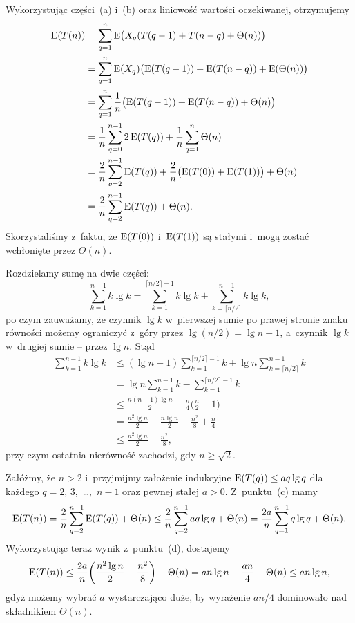 \subproblem %

\noindent Wykorzystując części~(a) i~(b) oraz liniowość wartości oczekiwanej, otrzymujemy
\begin{align*}
	\operatorname{E}(T(n)) &= \sum_{q=1}^n\operatorname{E}\bigl(X_q(T(q-1)+T(n-q)+\Theta(n))\bigr) \\
	&= \sum_{q=1}^n\operatorname{E}(X_q)\bigl(\operatorname{E}(T(q-1))+\operatorname{E}(T(n-q))+\operatorname{E}(\Theta(n))\bigr) \\
	&= \sum_{q=1}^n\frac{1}{n}\bigl(\operatorname{E}(T(q-1))+\operatorname{E}(T(n-q))+\Theta(n)\bigr) \\
	&= \frac{1}{n}\sum_{q=0}^{n-1}2\operatorname{E}(T(q))+\frac{1}{n}\sum_{q=1}^n\Theta(n) \\
	&= \frac{2}{n}\sum_{q=2}^{n-1}\operatorname{E}(T(q))+\frac{2}{n}\bigl(\operatorname{E}(T(0))+\operatorname{E}(T(1))\bigr)+\Theta(n) \\
	&= \frac{2}{n}\sum_{q=2}^{n-1}\operatorname{E}(T(q))+\Theta(n).
\end{align*}
Skorzystaliśmy z~faktu, że $\operatorname{E}(T(0))$ i~$\operatorname{E}(T(1))$ są stałymi i~mogą zostać wchłonięte przez $\Theta(n)$.

\subproblem %
Rozdzielamy sumę na dwie części:
\[
	\sum_{k=1}^{n-1}k\lg k = \sum_{k=1}^{\lceil n/2\rceil-1}k\lg k+\sum_{k=\lceil n/2\rceil}^{n-1}k\lg k,
\]
po czym zauważamy, że czynnik $\lg k$ w~pierwszej sumie po prawej stronie znaku równości możemy ograniczyć z~góry przez $\lg(n/2)=\lg n-1$, a~czynnik $\lg k$ w~drugiej sumie -- przez $\lg n$. Stąd
\begin{align*}
	\sum_{k=1}^{n-1}k\lg k &\le (\lg n-1)\sum_{k=1}^{\lceil n/2\rceil-1}k+\lg n\sum_{k=\lceil n/2\rceil}^{n-1}k \\
	&= \lg n\sum_{k=1}^{n-1}k-\sum_{k=1}^{\lceil n/2\rceil-1}k \\[2mm]
	&\le \frac{n(n-1)\lg n}{2}-\frac{n}{4}\biggl(\frac{n}{2}-1\biggr) \\
	&= \frac{n^2\lg n}{2}-\frac{n\lg n}{2}-\frac{n^2}{8}+\frac{n}{4} \\[1mm]
	&\le \frac{n^2\lg n}{2}-\frac{n^2}{8},
\end{align*}
przy czym ostatnia nierówność zachodzi, gdy $n\ge\sqrt{2}$.

\subproblem %
Załóżmy, że $n>2$ i~przyjmijmy założenie indukcyjne $\operatorname{E}(T(q))\le aq\lg q$ dla każdego $q=2$, 3,~\dots,~$n-1$ oraz pewnej stałej $a>0$. Z~punktu~(c) mamy
\[
	\operatorname{E}(T(n)) = \frac{2}{n}\sum_{q=2}^{n-1}\operatorname{E}(T(q))+\Theta(n) \le \frac{2}{n}\sum_{q=2}^{n-1}aq\lg q+\Theta(n) = \frac{2a}{n}\sum_{q=1}^{n-1}q\lg q+\Theta(n).
\]
Wykorzystując teraz wynik z~punktu~(d), dostajemy
\[
	\operatorname{E}(T(n)) \le \frac{2a}{n}\biggl(\frac{n^2\lg n}{2}-\frac{n^2}{8}\biggr)+\Theta(n) = an\lg n-\frac{an}{4}+\Theta(n) \le an\lg n,
\]
gdyż możemy wybrać $a$ wystarczająco duże, by wyrażenie $an/4$ dominowało nad składnikiem $\Theta(n)$.

